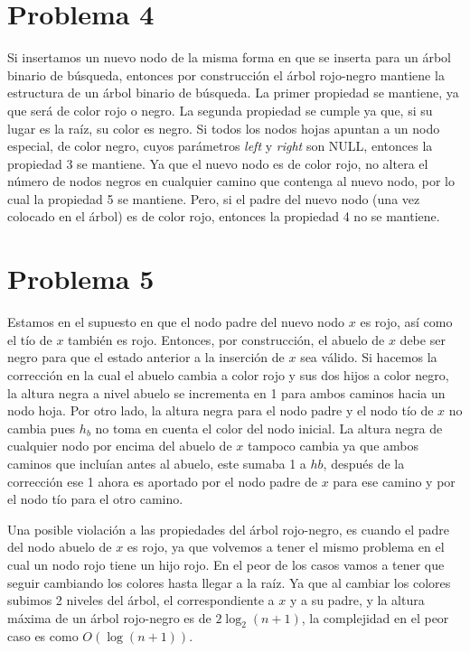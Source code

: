\documentclass[10pt,a4paper]{article}
\begin{document}
\section*{Problema 4}
Si insertamos un nuevo nodo de la misma forma en que se inserta para un \'arbol binario de b\'usqueda, entonces por construcci\'on el \'arbol rojo-negro mantiene la estructura de un \'arbol binario de b\'usqueda. La primer propiedad se mantiene, ya que ser\'a de color rojo o negro. La segunda propiedad se cumple ya que, si su lugar es la ra\'iz, su color es negro. Si todos los nodos hojas apuntan a un nodo especial, de color negro, cuyos par\'ametros \textit{left} y \textit{right} son NULL, entonces la propiedad 3 se mantiene. Ya que el nuevo nodo es de color rojo, no altera el n\'umero de nodos negros en cualquier camino que contenga al nuevo nodo, por lo cual la propiedad 5 se mantiene. Pero, si el padre del nuevo nodo (una vez colocado en el \'arbol) es de color rojo, entonces la propiedad 4 no se mantiene.

\section*{Problema 5}
Estamos en el supuesto en que el nodo padre del nuevo nodo $x$ es rojo, as\'i como el t\'io de $x$ tambi\'en es rojo. Entonces, por construcci\'on, el abuelo de $x$ debe ser negro para que el estado anterior a la inserci\'on de $x$ sea v\'alido. Si hacemos la correcci\'on en la cual el abuelo cambia a color rojo y sus dos hijos a color negro, la altura negra a nivel abuelo se incrementa en 1 para ambos caminos hacia un nodo hoja. Por otro lado, la altura negra para el nodo padre y el nodo t\'io de $x$ no cambia pues $h_b$ no toma en cuenta el color del nodo inicial. La altura negra de cualquier nodo por encima del abuelo de $x$ tampoco cambia ya que ambos caminos que inclu\'ian antes al abuelo, este sumaba 1 a $hb$, despu\'es de la correcci\'on ese 1 ahora es aportado por el nodo padre de $x$ para ese camino y por el nodo t\'io para el otro camino.\newline

Una posible violaci\'on a las propiedades del \'arbol rojo-negro, es cuando el padre del nodo abuelo de $x$ es rojo, ya que volvemos a tener el mismo problema en el cual un nodo rojo tiene un hijo rojo. En el peor de los casos vamos a tener que seguir cambiando los colores hasta llegar a la ra\'iz. Ya que al cambiar los colores subimos 2 niveles del \'arbol, el correspondiente a $x$ y a su padre, y la altura m\'axima de un \'arbol rojo-negro es de $2\log_2(n+1)$, la complejidad en el peor caso es como $O(\log(n+1))$.
\end{document}
